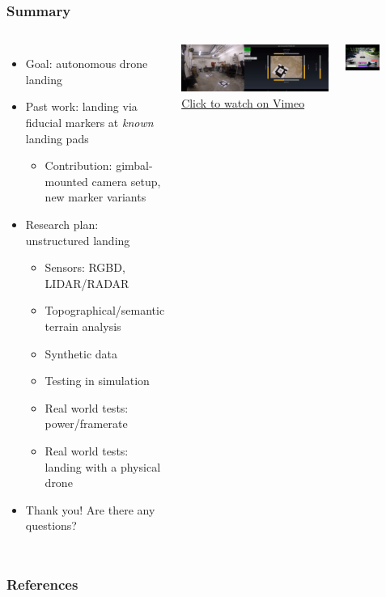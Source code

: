 \documentclass[aspectratio=169]{rubeamer}
\newif\ifpause
\newcommand{\mypause}{\ifpause \pause \fi}
\begin{document}
\begin{frame}
  \frametitle{Summary}
  \begin{columns}
      \begin{itemize}
        \item Goal: autonomous drone landing
        \mypause
        \item Past work: landing via fiducial markers at \textit{known} landing pads
        \begin{itemize}
          \item Contribution: gimbal-mounted camera setup, new marker variants
        \end{itemize}
        \mypause
        \item Research plan: unstructured landing
        \begin{itemize}
          \mypause
          \item Sensors: RGBD, LIDAR/RADAR
          \mypause
          \item Topographical/semantic terrain analysis
          \mypause
          \item Synthetic data
          \mypause
          \item Testing in simulation
          \mypause
          \item Real world tests: power/framerate
          \mypause
          \item Real world tests: landing with a physical drone
          \mypause
        \end{itemize}
        \item Thank you! Are there any questions?
      \end{itemize}

      \centering

      \onslide
      \includegraphics[width=\textwidth]{demo_screenshot}\\\href{https://vimeo.com/664863992}{\color{blue}Click to watch on Vimeo}\vspace{1cm}

      \includegraphics[width=0.5\textwidth]{airsim}
  \end{columns}
\end{frame}

\begin{frame}[allowframebreaks]
  \frametitle{References}
  \printbibliography{}
\end{frame}
\end{document}
